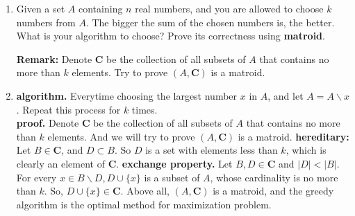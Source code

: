 \documentclass[12pt,a4paper]{article}
\makeatletter
\newtheorem*{solution}{Solution}
\theoremstyle{definition}
\renewenvironment{solution}[1][Solution] {\par\pushQED{\qed}\normalfont\topsep6\p@\@plus6\p@\relax\trivlist\item[\hskip\labelsep\bfseries#1\@addpunct{.}]\ignorespaces}{\popQED\endtrivlist\@endpefalse} \makeatother
\makeatother
\begin{document}
\begin{enumerate}
\begin{enumerate}
\begin{proof}
	    \end{proof}
	\item
	Given a set $A$ containing $n$ real numbers, and you are allowed to choose $k$ numbers from $A$. The bigger the sum of the chosen numbers is, the better. What is your algorithm to choose? Prove its correctness using \textbf{matroid}.\par
	\textbf{Remark:} Denote $\mathbf{C}$ be the collection of all subsets of $A$ that contains no more than $k$ elements. Try to prove $(A,\mathbf{C})$ is a matroid.\par
	    \begin{solution}
	        \textbf{algorithm.} Everytime choosing the largest number $x$ in $A$, and let $A=A\backslash x$. Repeat this process for $k$ times.
			\\\textbf{proof.} Denote $\mathbf{C}$ be the collection of all subsets of $A$ that contains no more than $k$ elements. And we will try to prove $(A,\mathbf{C})$ is a matroid. \textbf{hereditary:} Let $B\in \mathbf{C}$, and $D\subset B$. So $D$ is a set with elements less than $k$, which is clearly an element of $\mathbf{C}$.
			\textbf{exchange property.} Let $B,D\in \mathbf{C}$ and $|D|<|B|$. For every $x\in B\backslash D,D\cup \{x\}$ is a subset of $A$, whose cardinality is no more than $k$. So, $D\cup \{x\}\in \mathbf{C}$. Above all, $(A,\mathbf{C})$ is a matroid, and the greedy algorithm is the optimal method for maximization problem. 
	    \end{solution}


\end{enumerate}
\end{enumerate}
\end{document}
